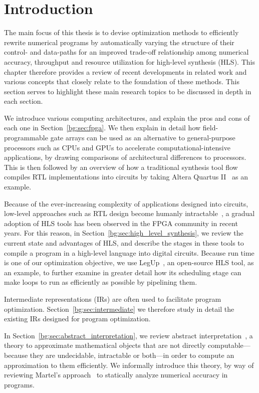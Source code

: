 \section{Introduction}
\label{bg:sec:introduction}

The main focus of this thesis is to devise optimization methods to efficiently
rewrite numerical programs by automatically varying the structure of their
control- and data-paths for an improved trade-off relationship among numerical
accuracy, throughput and resource utilization for high-level synthesis (HLS).
This chapter therefore provides a review of recent developments in related work
and various concepts that closely relate to the foundation of these methods.
This section serves to highlight these main research topics to be discussed in
depth in each section.

We introduce various computing architectures, and explain the pros and cons
of each one in Section~\ref{bg:sec:fpga}.  We then explain in detail how
field-programmable gate arrays can be used as an alternative to general-purpose
processors such as CPUs and GPUs to accelerate computational-intensive
applications, by drawing comparisons of architectural differences to
processors.  This is then followed by an overview of how a traditional
synthesis tool flow compiles RTL implementations into circuits by taking Altera
Quartus II~\cite{quartus} as an example.

Because of the ever-increasing complexity of applications designed
into circuits, low-level approaches such as RTL design become humanly
intractable~\cite{gajski}, a gradual adoption of HLS tools has been
observed in the FPGA community in recent years.  For this reason, in
Section~\ref{bg:sec:high_level_synthesis}, we review the current state and
advantages of HLS, and describe the stages in these tools to compile a program
in a high-level language into digital circuits.  Because run time is one of our
optimization objective, we use LegUp~\cite{legup}, an open-source HLS tool, as
an example, to further examine in greater detail how its scheduling stage can
make loops to run as efficiently as possible by pipelining them.

Intermediate representations (IRs) are often used to facilitate program
optimization.  Section~\ref{bg:sec:intermediate} we therefore study in detail
the existing IRs designed for program optimization.

In Section~\ref{bg:sec:abstract_interpretation}, we review abstract
interpretation~\cite{cousot77}, a theory to approximate mathematical objects
that are not directly computable---because they are undecidable, intractable or
both---in order to compute an approximation to them efficiently.  We informally
introduce this theory, by way of reviewing Martel's approach~\cite{martel07} to
statically analyze numerical accuracy in programs.

